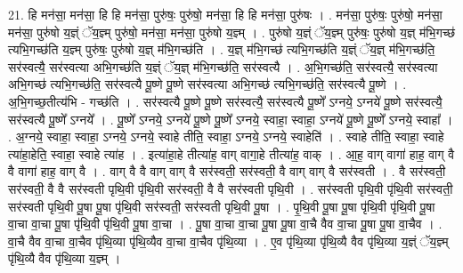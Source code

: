 \documentclass[17pt]{extarticle}
\begin{document}
21. हि मन॑सा॒ मन॑सा॒ हि हि मन॑सा॒ पुरु॑षः॒ पुरु॑षो॒ मन॑सा॒ हि हि मन॑सा॒ पुरु॑षः । . मन॑सा॒ पुरु॑षः॒ पुरु॑षो॒ मन॑सा॒ मन॑सा॒ पुरु॑षो य॒ज्ञ्ं ॅय॒ज्ञ्म् पुरु॑षो॒ मन॑सा॒ मन॑सा॒ पुरु॑षो य॒ज्ञ्म् । . पुरु॑षो य॒ज्ञ्ं ॅय॒ज्ञ्म् पुरु॑षः॒ पुरु॑षो य॒ज्ञ् म॑भि॒गच्छ॑ त्यभि॒गच्छ॑ति य॒ज्ञ्म् पुरु॑षः॒ पुरु॑षो य॒ज्ञ् म॑भि॒गच्छ॑ति । . य॒ज्ञ् म॑भि॒गच्छ॑ त्यभि॒गच्छ॑ति य॒ज्ञ्ं ॅय॒ज्ञ् म॑भि॒गच्छ॑ति॒ सर॑स्वत्यै॒ सर॑स्वत्या अभि॒गच्छ॑ति य॒ज्ञ्ं ॅय॒ज्ञ् म॑भि॒गच्छ॑ति॒ सर॑स्वत्यै । . अ॒भि॒गच्छ॑ति॒ सर॑स्वत्यै॒ सर॑स्वत्या अभि॒गच्छ॑ त्यभि॒गच्छ॑ति॒ सर॑स्वत्यै पू॒ष्णे पू॒ष्णे सर॑स्वत्या अभि॒गच्छ॑ त्यभि॒गच्छ॑ति॒ सर॑स्वत्यै पू॒ष्णे । . अ॒भि॒गच्छ॒तीत्य॑भि - गच्छ॑ति । . सर॑स्वत्यै पू॒ष्णे पू॒ष्णे सर॑स्वत्यै॒ सर॑स्वत्यै पू॒ष्णे᳚ ऽग्नये॒ ऽग्नये॑ पू॒ष्णे सर॑स्वत्यै॒ सर॑स्वत्यै पू॒ष्णे᳚ ऽग्नये᳚ । . पू॒ष्णे᳚ ऽग्नये॒ ऽग्नये॑ पू॒ष्णे पू॒ष्णे᳚ ऽग्नये॒ स्वाहा॒ स्वाहा॒ ऽग्नये॑ पू॒ष्णे पू॒ष्णे᳚ ऽग्नये॒ स्वाहा᳚ । . अ॒ग्नये॒ स्वाहा॒ स्वाहा॒ ऽग्नये॒ ऽग्नये॒ स्वाहे तीति॒ स्वाहा॒ ऽग्नये॒ ऽग्नये॒ स्वाहेति॑ । . स्वाहे तीति॒ स्वाहा॒ स्वाहे त्या॑हा॒हेति॒ स्वाहा॒ स्वाहे त्या॑ह । . इत्या॑हा॒हे तीत्या॑ह॒ वाग् वागा॒हे तीत्या॑ह॒ वाक् । . आ॒ह॒ वाग् वागा॑ हाह॒ वाग् वै वै वागा॑ हाह॒ वाग् वै । . वाग् वै वै वाग् वाग् वै सर॑स्वती॒ सर॑स्वती॒ वै वाग् वाग् वै सर॑स्वती । . वै सर॑स्वती॒ सर॑स्वती॒ वै वै सर॑स्वती पृथि॒वी पृ॑थि॒वी सर॑स्वती॒ वै वै सर॑स्वती पृथि॒वी । . सर॑स्वती पृथि॒वी पृ॑थि॒वी सर॑स्वती॒ सर॑स्वती पृथि॒वी पू॒षा पू॒षा पृ॑थि॒वी सर॑स्वती॒ सर॑स्वती पृथि॒वी पू॒षा । . पृ॒थि॒वी पू॒षा पू॒षा पृ॑थि॒वी पृ॑थि॒वी पू॒षा वा॒चा वा॒चा पू॒षा पृ॑थि॒वी पृ॑थि॒वी पू॒षा वा॒चा । . पू॒षा वा॒चा वा॒चा पू॒षा पू॒षा वा॒चै वैव वा॒चा पू॒षा पू॒षा वा॒चैव । . वा॒चै वैव वा॒चा वा॒चैव पृ॑थि॒व्या पृ॑थि॒व्यैव वा॒चा वा॒चैव पृ॑थि॒व्या । . ए॒व पृ॑थि॒व्या पृ॑थि॒व्यै वैव पृ॑थि॒व्या य॒ज्ञ्ं ॅय॒ज्ञ्म् पृ॑थि॒व्यै वैव पृ॑थि॒व्या य॒ज्ञ्म् । \newline
\end{document}
